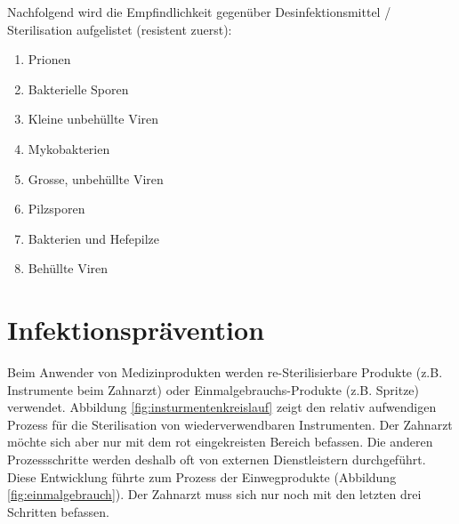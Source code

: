 Nachfolgend wird die Empfindlichkeit gegenüber Desinfektionsmittel / Sterilisation aufgelistet (resistent zuerst):
\begin{enumerate}
	\item Prionen
	\item Bakterielle Sporen
	\item Kleine unbehüllte Viren
	\item Mykobakterien
	\item Grosse, unbehüllte Viren
	\item Pilzsporen
	\item Bakterien und Hefepilze
	\item Behüllte Viren
\end{enumerate}

\section{Infektionsprävention}

Beim Anwender von Medizinprodukten werden re-Sterilisierbare Produkte (z.B. Instrumente beim Zahnarzt) oder Einmalgebrauchs-Produkte (z.B. Spritze) verwendet. Abbildung \ref{fig:insturmentenkreislauf} zeigt den relativ aufwendigen Prozess für die Sterilisation von wiederverwendbaren Instrumenten. Der Zahnarzt möchte sich aber nur mit dem rot eingekreisten Bereich befassen. Die anderen Prozessschritte werden deshalb oft von externen Dienstleistern durchgeführt. Diese Entwicklung führte zum Prozess der Einwegprodukte (Abbildung \ref{fig:einmalgebrauch}). Der Zahnarzt muss sich nur noch mit den letzten drei Schritten befassen.

